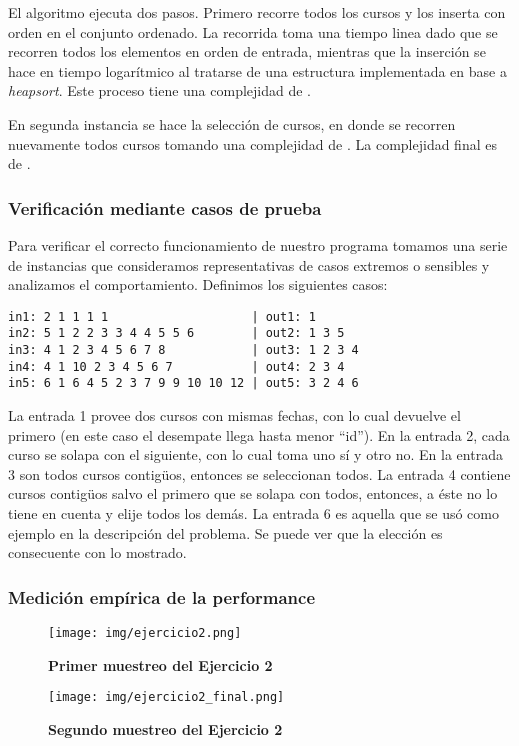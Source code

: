 \documentclass[11pt, a4paper, twoside]{article}
\begin{document}
El algoritmo ejecuta dos pasos. Primero recorre todos los cursos y los
inserta con orden en el conjunto ordenado. La recorrida toma una tiempo
linea  dado que se recorren todos los elementos en orden de entrada,
mientras que la inserción se hace en tiempo logarítmico al tratarse de una
estructura implementada en base a \textit{heapsort}. Este proceso tiene
una complejidad de .

En segunda instancia se hace la selección de cursos, en donde se recorren
nuevamente todos cursos tomando una complejidad de . La complejidad
final es de .

\subsubsection{Verificación mediante casos de prueba}

Para verificar el correcto funcionamiento de nuestro programa tomamos
una serie de instancias que consideramos representativas de casos extremos
o sensibles y analizamos el comportamiento. Definimos los siguientes casos:

\begin{verbatim}
in1: 2 1 1 1 1                    | out1: 1
in2: 5 1 2 2 3 3 4 4 5 5 6        | out2: 1 3 5
in3: 4 1 2 3 4 5 6 7 8            | out3: 1 2 3 4
in4: 4 1 10 2 3 4 5 6 7           | out4: 2 3 4
in5: 6 1 6 4 5 2 3 7 9 9 10 10 12 | out5: 3 2 4 6
\end{verbatim}

La entrada 1 provee dos cursos con mismas fechas, con lo cual devuelve el primero
(en este caso el desempate llega hasta menor \enquote{id}).
En la entrada 2, cada curso se solapa con el siguiente, con lo cual
toma uno sí y otro no. En la entrada 3 son todos cursos contigüos,
entonces se seleccionan todos. La entrada 4 contiene cursos contigüos
salvo el primero que se solapa con todos, entonces, a éste no lo tiene
en cuenta y elije todos los demás. La entrada 6 es aquella que se usó como
ejemplo en la descripción del problema. Se puede ver que la elección
es consecuente con lo mostrado.

\clearpage
\subsubsection{Medición empírica de la performance}

\begin{figure}[H]
   \begin{center}
   \texttt{[image: img/ejercicio2.png]}
   \caption{\textbf{Primer muestreo del Ejercicio 2}}
   \label{fig:ej2}
   \end{center}
\end{figure}

\begin{figure}[H]
   \begin{center}
   \texttt{[image: img/ejercicio2\_final.png]}
   \caption{\textbf{Segundo muestreo del Ejercicio 2}}
   \label{fig:ej2-final}
   \end{center}
\end{figure}

\end{document}
